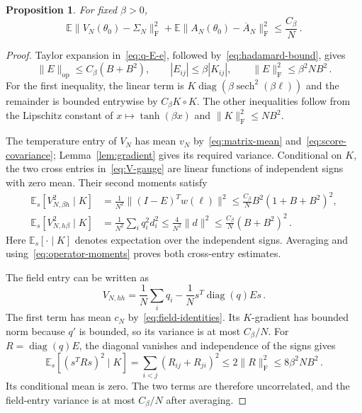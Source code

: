 \documentclass[11pt]{amsart}
\numberwithin{equation}{section}
\newtheorem{proposition}[theorem]{Proposition}
\theoremstyle{remark}
\newcommand{\E}{\mathbb E}
\newcommand{\diag}{\operatorname{diag}}
\newcommand{\sech}{\operatorname{sech}}
\newcommand{\op}{\mathrm{op}}
\newcommand{\Frob}{\mathrm{F}}
\begin{document}
\begin{proposition}\label{prop:matrix-concentration}
For fixed $\beta>0$,
\begin{equation}
 \E\|V_N(\theta_0)-\Sigma_N\|_\Frob^2
 +\E\|A_N(\theta_0)-\overline A_N\|_\Frob^2
 \le\frac{C_\beta}{N}\,.
 \label{eq:matrix-concentration}
\end{equation}
\end{proposition}
\begin{proof}
Taylor expansion in~\eqref{eq:q-E-e}, followed by~\eqref{eq:hadamard-bound}, gives
\begin{equation}
 \|E\|_\op\le C_\beta(B+B^2),\qquad
 |E_{ij}|\le\beta|K_{ij}|,\qquad
 \|E\|_\Frob^2\le\beta^2NB^2\,.
 \label{eq:E-bounds}
\end{equation}
For the first inequality, the linear term is $K\diag(\beta\sech^2(\beta\ell))$ and the remainder is bounded entrywise by $C_\beta K\circ K$. The other inequalities follow from the Lipschitz constant of $x\mapsto\tanh(\beta x)$ and $\|K\|_\Frob^2\le NB^2$.

The temperature entry of $V_N$ has mean $v_N$ by~\eqref{eq:matrix-mean} and~\eqref{eq:score-covariance}; Lemma~\ref{lem:gradient} gives its required variance. Conditional on $K$, the two cross entries in~\eqref{eq:V-gauge} are linear functions of independent signs with zero mean. Their second moments satisfy
\begin{align*}
 \E_s[V_{N,\beta h}^2\mid K]
 &=\frac1{N^2}\|(I-E)^Tw(\ell)\|^2
 \le\frac{C_\beta}N B^2(1+B+B^2)^2,\\
 \E_s[V_{N,h\beta}^2\mid K]
 &=\frac1{N^2}\sum_iq_i^2d_i^2
 \le\frac4{N^2}\|d\|^2
 \le\frac{C_\beta}N(B+B^2)^2\,.
\end{align*}
Here $\E_s[\cdot\mid K]$ denotes expectation over the independent signs. Averaging and using~\eqref{eq:operator-moments} proves both cross-entry estimates.

The field entry can be written as
\begin{equation*}
 V_{N,hh}=\frac1N\sum_iq_i-\frac1Ns^T\diag(q)Es\,.
\end{equation*}
The first term has mean $c_N$ by~\eqref{eq:field-identities}. Its $K$-gradient has bounded norm because $q'$ is bounded, so its variance is at most $C_\beta/N$. For $R=\diag(q)E$, the diagonal vanishes and independence of the signs gives
\begin{equation*}
 \E_s[(s^TRs)^2\mid K]
 =\sum_{i<j}(R_{ij}+R_{ji})^2
 \le2\|R\|_\Frob^2\le8\beta^2NB^2\,.
\end{equation*}
Its conditional mean is zero. The two terms are therefore uncorrelated, and the field-entry variance is at most $C_\beta/N$ after averaging.


\end{proof}
\end{document}
